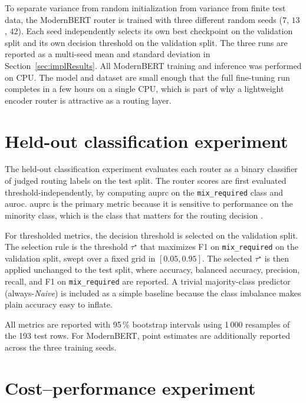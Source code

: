 \documentclass[english, bibtex]{kththesis}               %
\numberwithin{listing}{chapter}
\begin{document}
To separate variance from random initialization from variance from finite test data, the ModernBERT router is trained with three different random seeds ($7$, $13$, $42$). Each seed independently selects its own best checkpoint on the validation split and its own decision threshold on the validation split. The three runs are reported as a multi-seed mean and standard deviation in Section~\ref{sec:implResults}. All ModernBERT training and inference was performed on CPU. The model and dataset are small enough that the full fine-tuning run completes in a few hours on a single CPU, which is part of why a lightweight encoder router is attractive as a routing layer.

\section{Held-out classification experiment}
\label{sec:implClassification}

The held-out classification experiment evaluates each router as a binary classifier of judged routing labels on the test split. The router scores are first evaluated threshold-independently, by computing \gls{auprc} on the \texttt{mix\_required} class and \gls{auroc}. \Gls{auprc} is the primary metric because it is sensitive to performance on the minority class, which is the class that matters for the routing decision \cite{saito2015precision}.

For thresholded metrics, the decision threshold is selected on the validation split. The selection rule is the threshold $\tau^\star$ that maximizes F1 on \texttt{mix\_required} on the validation split, swept over a fixed grid in $[0.05, 0.95]$. The selected $\tau^\star$ is then applied unchanged to the test split, where accuracy, balanced accuracy, precision, recall, and F1 on \texttt{mix\_required} are reported. A trivial majority-class predictor (always-\emph{Naive}) is included as a simple baseline because the class imbalance makes plain accuracy easy to inflate.

All metrics are reported with 95\,\% bootstrap intervals \cite{efron1979bootstrap} using 1\,000 resamples of the 193 test rows. For ModernBERT, point estimates are additionally reported across the three training seeds.

\section{Cost--performance experiment}
\label{sec:implPolicy}
\end{document}
